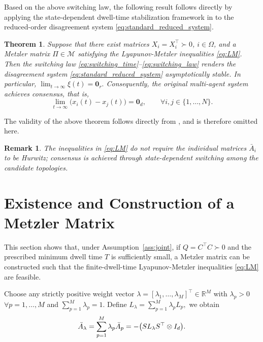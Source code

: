 \documentclass[conference]{IEEEtran}
\newtheorem{theorem}{Theorem}
\newtheorem{remark}{Remark}
\begin{document}
	Based on the above switching law, the following result follows directly by applying the
	state-dependent dwell-time stabilization framework in
	\cite{russo2025} to the reduced-order disagreement system
	\eqref{eq:standard_reduced_system}.
	
	\begin{theorem}\label{thm:switching}
		Suppose that there exist matrices
		$X_i=X_i^\top\succ0$, $i\in\Omega$, and a Metzler matrix
		$\Pi\in\mathcal{M}$ satisfying the Lyapunov-Metzler
		inequalities \eqref{eq:LM}. Then the switching law
		\eqref{eq:switching_time}--\eqref{eq:switching_law} renders
		the disagreement system \eqref{eq:standard_reduced_system}
		asymptotically stable. In particular,
		$
		\lim_{t\to\infty}\xi(t)=\mathbf 0_r.
		$
		Consequently, the original multi-agent system achieves consensus, that is,
		\[
		\lim_{t\to\infty}
		\bigl(x_i(t)-x_j(t)\bigr)
		=
		\mathbf 0_d,
		\qquad
		\forall i,j\in\{1,\ldots,N\}.
		\]
	\end{theorem}
	
	The validity of the above theorem follows directly from \cite[Theorem~1]{russo2025}, and is therefore omitted here.
	
	\begin{remark}
		The inequalities in \eqref{eq:LM} do not require the individual
		matrices $\bar A_i$ to be Hurwitz; consensus is achieved through
		state-dependent switching among the candidate topologies.
	\end{remark}
	
	\section{Existence and Construction of a Metzler Matrix}
	\label{sec:metzler_existence}
	
	This section shows that, under Assumption~\ref{ass:joint},
	if
	$
	Q=C^\top C\succ0
	$
	and the prescribed minimum dwell time $T$ is sufficiently small, a Metzler matrix can be constructed such that the finite-dwell-time Lyapunov-Metzler inequalities \eqref{eq:LM} are feasible.
	
	Choose any strictly positive weight vector
	$
	\lambda
	=
	[\lambda_1,\ldots,\lambda_M]^\top
	\in\mathbb R^M
	$
	with
	$
	\lambda_p>0
	$
	$\forall p=1,\ldots,M$ and 
	$
	\sum_{p=1}^{M}\lambda_p=1.
	$
	Define
	$
	L_\lambda
	=
	\sum_{p=1}^{M}\lambda_pL_p,
	$ we obtain
	\vspace{-0.2\baselineskip}
	\[
	\bar A_\lambda
	=
	\sum_{p=1}^{M}\lambda_p\bar A_p
	=
	-\bigl(SL_\lambda S^\top\otimes I_d\bigr).
	\vspace{-0.2\baselineskip}
	\]
	
\end{document}
